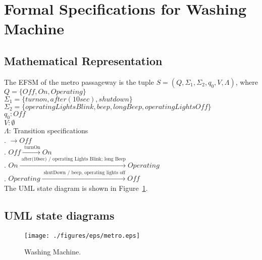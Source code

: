 \newpage
\section{Formal Specifications for Washing Machine}

\subsection{Mathematical Representation}

\noindent The EFSM of the metro passageway is the tuple $S = (Q, \Sigma_1, \Sigma_2, q_0, V, \Lambda)$, where\\

\noindent $Q = \{Off, On, Operating\}$\\
\noindent $\Sigma_1 = \{turn on, after(10sec), shut down\}$\\
\noindent $\Sigma_2 = \{operating Lights Blink, beep, long Beep, operating Lights Off\}$\\
\noindent $q_0: Off$\\
\noindent $V: \emptyset$\\
\noindent $\Lambda$: Transition specifications\\
. $\rightarrow Off$\\
. $Off \xrightarrow {\text { turnOn}} On$\\
. $On \xrightarrow {\text { after(10sec) / operating Lights Blink; long Beep}} Operating$\\
. $Operating \xrightarrow {\text { shutDown / beep, operating lights off}} Off$\\

\noindent The UML state diagram is shown in Figure~\ref{fig:metro-fig}.

\newpage

\subsection{UML state diagrams}

\begin{figure}[h!]
	\centering
		\texttt{[image: ./figures/eps/metro.eps]}
		  \caption{Washing Machine.}
  \label{fig:metro-fig}
\end{figure}



